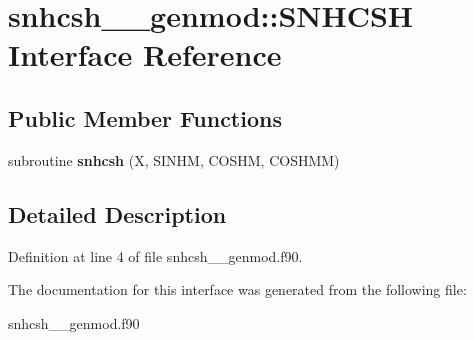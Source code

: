 \hypertarget{interfacesnhcsh____genmod_1_1_s_n_h_c_s_h}{\section{snhcsh\+\_\+\+\_\+genmod\+:\+:S\+N\+H\+C\+S\+H Interface Reference}
\label{interfacesnhcsh____genmod_1_1_s_n_h_c_s_h}
}
\subsection*{Public Member Functions}
\begin{DoxyCompactItemize}
\item 
\hypertarget{interfacesnhcsh____genmod_1_1_s_n_h_c_s_h_af9ae6d22a42638aabdc9988baf7ec19f}{subroutine {\bfseries snhcsh} (X, S\+I\+N\+H\+M, C\+O\+S\+H\+M, C\+O\+S\+H\+M\+M)}\label{interfacesnhcsh____genmod_1_1_s_n_h_c_s_h_af9ae6d22a42638aabdc9988baf7ec19f}

\end{DoxyCompactItemize}


\subsection{Detailed Description}


Definition at line 4 of file snhcsh\+\_\+\+\_\+genmod.\+f90.



The documentation for this interface was generated from the following file\+:\begin{DoxyCompactItemize}
\item 
snhcsh\+\_\+\+\_\+genmod.\+f90\end{DoxyCompactItemize}
